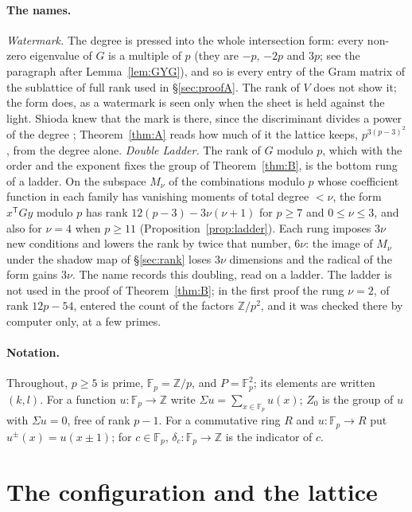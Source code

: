 \documentclass[11pt]{article}
\theoremstyle{definition}
\theoremstyle{remark}
\newcommand{\Z}{\mathbb{Z}}
\newcommand{\F}{\mathbb{F}}
\begin{document}
\paragraph{The names.} \emph{Watermark.} The degree is pressed into the whole intersection form: every non-zero eigenvalue of $G$ is a multiple of $p$ (they are $-p$, $-2p$ and $3p$; see the paragraph after Lemma~\ref{lem:GYG}), and so is every entry of the Gram matrix of the sublattice of full rank used in \S\ref{sec:proofA}. The rank of $V$ does not show it; the form does, as a watermark is seen only when the sheet is held against the light. Shioda knew that the mark is there, since the discriminant divides a power of the degree \cite[Added in proof]{Sh87}; Theorem~\ref{thm:A} reads how much of it the lattice keeps, $p^{3(p-3)^2}$, from the degree alone. \emph{Double Ladder.} The rank of $G$ modulo $p$, which with the order and the exponent fixes the group of Theorem~\ref{thm:B}, is the bottom rung of a ladder. On the subspace $M_\nu$ of the combinations modulo $p$ whose coefficient function in each family has vanishing moments of total degree $<\nu$, the form $x^{\mathsf T}Gy$ modulo $p$ has rank $12(p-3)-3\nu(\nu+1)$ for $p\ge7$ and $0\le\nu\le3$, and also for $\nu=4$ when $p\ge11$ (Proposition~\ref{prop:ladder}). Each rung imposes $3\nu$ new conditions and lowers the rank by twice that number, $6\nu$: the image of $M_\nu$ under the shadow map of \S\ref{sec:rank} loses $3\nu$ dimensions and the radical of the form gains $3\nu$. The name records this doubling, read on a ladder. The ladder is not used in the proof of Theorem~\ref{thm:B}; in the first proof \cite{DL} the rung $\nu=2$, of rank $12p-54$, entered the count of the factors $\Z/p^2$, and it was checked there by computer only, at a few primes.

\paragraph{Notation.} Throughout, $p\ge5$ is prime, $\F_p=\Z/p$, and $P=\F_p^2$; its elements are written $(k,l)$. For a function $u:\F_p\to\Z$ write $\Sigma u=\sum_{x\in\F_p}u(x)$; $Z_0$ is the group of $u$ with $\Sigma u=0$, free of rank $p-1$. For a commutative ring $R$ and $u:\F_p\to R$ put $u^{\pm}(x)=u(x\pm1)$; for $c\in\F_p$, $\delta_c:\F_p\to\Z$ is the indicator of $c$.

\section{The configuration and the lattice}\label{sec:config}
\end{document}
